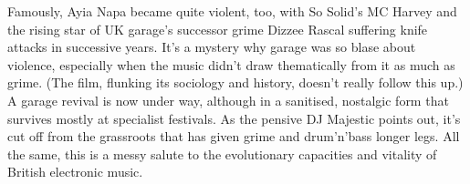 \documentclass{article}
\begin{document}
Famously, Ayia Napa became quite violent, too, with So Solid’s MC Harvey and the rising star of UK garage’s successor grime Dizzee Rascal suffering knife attacks in successive years. It’s a mystery why garage was so blase about violence, especially when the music didn’t draw thematically from it as much as grime. (The film, flunking its sociology and history, doesn’t really follow this up.) A garage revival is now under way, although in a sanitised, nostalgic form that survives mostly at specialist festivals. As the pensive DJ Majestic points out, it’s cut off from the grassroots that has given grime and drum’n’bass longer legs. All the same, this is a messy salute to the evolutionary capacities and vitality of British electronic music.
\end{document}
